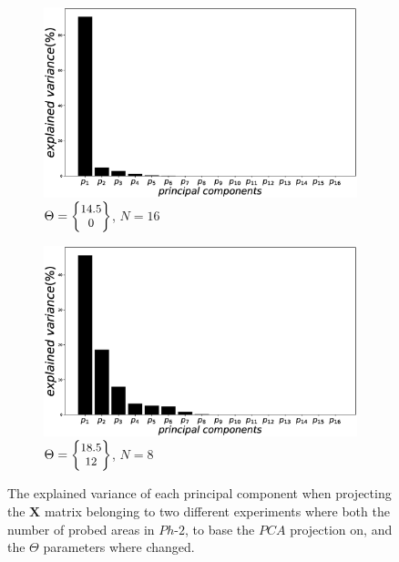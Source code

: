 \begin{figure}[]
	\centering
	\begin{subfigure}[b]{.47\textwidth}
		\includegraphics[width=\textwidth]{./figs/phantom2properties_pcafig_Vertical-d14_5.eps}
		\caption{$\Theta = \small{\begin{Bmatrix}14.5\\ 0\end{Bmatrix}}$, $N=16$}
		\label{hist:1}
	\end{subfigure}
	\hspace{0.01\textwidth}
	\begin{subfigure}[b]{.47\textwidth}
		\includegraphics[width=\textwidth]{./figs/phantom2properties3-12-13-21-42-24-31-31-2_pcafig_Rotate-d190-r120.eps}
		\caption{$\Theta = \small{\begin{Bmatrix}18.5\\ 12\end{Bmatrix}}$, $N=8$}
		\label{hist:2}
	\end{subfigure}
	\caption[]{The explained variance of each principal component when projecting the $\mathbf{X}$ 
		matrix belonging to two different experiments where both the number of probed areas in $Ph\text{-}2$, to base the $PCA$ projection on, and the $\Theta$ parameters where changed.}
	\label{hist}
\end{figure}
